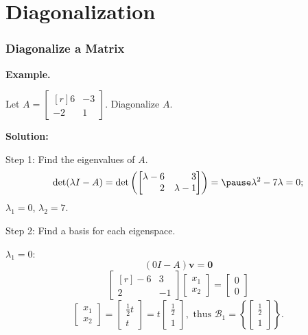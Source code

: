\documentclass[10pt]{beamer}
\begin{document}
\section{Diagonalization}
\begin{frame}
\frametitle{Diagonalize a Matrix}

{\bf Example.} 

Let $A = \begin{bmatrix*}[r]
6&-3\\
-2&1
\end{bmatrix*}$. Diagonalize $A$.\pause

{\bf Solution:}

Step 1: Find the eigenvalues of $A$.
\[
\det(\lambda I - A) = \det\left(\begin{bmatrix*}[r]
\lambda - 6&3\\
2&\lambda - 1
\end{bmatrix*}\right) = \pause \lambda^2 - 7\lambda = 0;
\]
$\lambda_1 = 0$, $\lambda_2 = 7$.\pause

Step 2: Find a basis for each eigenspace.\pause

$\lambda_1 = 0$:\pause
\[
 (0 I - A)\mathbf v = \mathbf 0
\]
\pause
\[
\begin{bmatrix*}[r]
-6&3\\
2&-1
\end{bmatrix*}\begin{bmatrix}
x_1\\
x_2
\end{bmatrix} = \begin{bmatrix}
0\\0	
\end{bmatrix}
\]\pause
\[
\begin{bmatrix}
x_1\\
x_2	
\end{bmatrix} = \begin{bmatrix}
\frac{1}{2}t\\
t
\end{bmatrix} = t \begin{bmatrix}
\frac{1}{2}\\
1
\end{bmatrix}, \text{ thus } \mathscr B_1 = \left\{ \begin{bmatrix}
\frac{1}{2}\\
1
\end{bmatrix}\right\}.
\]

\end{frame}
\end{document}
